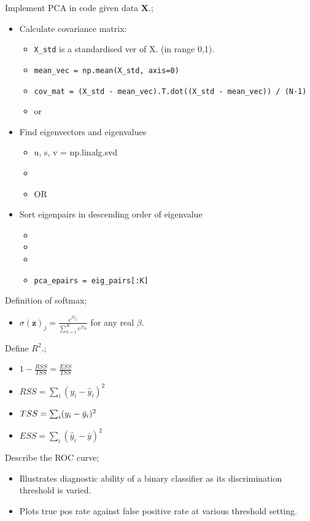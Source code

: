 \documentclass{article}
\begin{document}
Implement PCA in code given data $\mathbf{X}$.; \begin{itemize} \item Calculate covariance matrix: \begin{itemize} \item \texttt{X_std} is a standardised ver of X. (in range 0,1). \item \texttt{mean_vec = np.mean(X_std, axis=0)} \item \texttt{cov_mat = (X_std - mean_vec).T.dot((X_std - mean_vec)) / (N-1)} \item or  \end{itemize} \item Find eigenvectors and eigenvalues \begin{itemize} \item u, s, v = np.linalg.svd \item {} \item OR  \end{itemize} \item Sort eigenpairs in descending order of eigenvalue \begin{itemize} \item {} \item {} \item {} \item \texttt{pca_epairs = eig_pairs[:K]} \end{itemize} \end{itemize}

Definition of softmax; \begin{itemize} \item $\sigma(\mathbf{z})_j = \frac{e^{\beta z_j}}{\sum_{k=1}^Ke^{\beta z_k}}$ for any real $\beta$. \end{itemize}

Define $R^2$.; \begin{itemize} \item $1-\frac{RSS}{TSS} = \frac{ESS}{TSS}$ \item $RSS = \sum_i(y_i-\hat{y}_i)^2$ \item $TSS=\sum_i(y_i-\Bar{y}_i)^2$ \item $ESS=\sum_i(\hat{y}_i - \bar{y})^2$ \end{itemize}

Describe the ROC curve; \begin{itemize} \item Illustrates diagnostic ability of a binary classifier as its discrimination threshold is varied. \item Plots true pos rate against false positive rate at various threshold setting. \end{itemize} 
\end{document}
